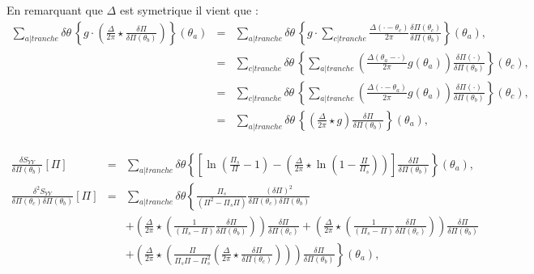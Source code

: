 		En remarquant que $\Delta$ est symetrique il vient que : 
	\begin{eqnarray}
		\sum_{a\vert tranche}   \delta \theta \,  \left \{ g  \cdot  	\left  ( \frac{\Delta}{2\pi} \star  \frac{\delta \Pi}{\delta \Pi(\theta_b)} \right ) \right \}( \theta_a) & = & \sum_{a\vert tranche}   \delta \theta \,  \left \{ g  \cdot  \sum_{c\vert tranche}    	
		 \frac{\Delta ( \cdot - \theta_c)}{2\pi}  \frac{\delta \Pi (\theta_c) }{\delta \Pi(\theta_b)}\right \}( \theta_a),\\
		 & = & \sum_{c\vert tranche}   \delta \theta \,  \left \{  \sum_{a\vert tranche}      	
		  \left ( \frac{\Delta ( \theta_a - \cdot )}{2\pi}  g ( \theta_a) \right ) \frac{\delta \Pi (\cdot) }{\delta \Pi(\theta_b)}\right \}( \theta_c),\\
		  & = & \sum_{c\vert tranche}   \delta \theta \,  \left \{  \sum_{a\vert tranche}      	
		  \left ( \frac{\Delta ( \cdot - \theta_a)}{2\pi}  g ( \theta_a) \right ) \frac{\delta \Pi (\cdot) }{\delta \Pi(\theta_b)}\right \}( \theta_c),\\
		  & = & \sum_{a\vert tranche}   \delta \theta \,  \left \{        	
		  \left ( \frac{\Delta}{2\pi}   \star g \right ) \frac{\delta \Pi  }{\delta \Pi(\theta_b)}\right \}( \theta_a),\\
	\end{eqnarray}	
	
	\begin{eqnarray}
			\frac{ \delta S_{YY} }{ \delta \Pi(\theta_b)} [\Pi ]  & = & \sum_{a\vert tranche}   \delta \theta \left \{ \left [ \ln \left ( \frac{ \Pi_s }{ \Pi} - 1 \right ) -  \left ( \frac{ \Delta}{2 \pi} \star \ln \left ( 1 - \frac{ \Pi}{ \Pi_s}\right )  \right) \right ]\frac{\delta \Pi }{ \delta \Pi (\theta_b) } \right \} ( \theta_	a ),\\
			\frac{ \delta^2 S_{YY} }{ \delta \Pi(\theta_c) \delta \Pi(\theta_b)  } [\Pi ]  & = & \sum_{a \vert tranche}   \delta \theta \left \{  \frac{\Pi_s}{(\Pi^2  - \Pi_s\Pi)} \frac{(\delta \Pi)^2}{ \delta \Pi(\theta_c) \delta \Pi(\theta_b)  } \right . \\
		&  &  +  \left . \left (  \frac{\Delta}{2\pi} \star \left ( \frac{1 }{(\Pi_s -\Pi) }  \frac{\delta \Pi}{\delta \Pi(\theta_b)}  \right )   \right ) \frac{\delta \Pi}{\delta \Pi(\theta_c)}+  \left (  \frac{\Delta}{2\pi} \star \left ( \frac{1}{( \Pi_s -  \Pi) } \frac{\delta \Pi}{\delta \Pi(\theta_c)} \right) \right )\frac{\delta \Pi}{\delta \Pi(\theta_b)}  \right . \\
		& & + \left .  \left (  \frac{\Delta}{2\pi} \star \left ( \frac{\Pi }{\Pi_s\Pi - \Pi_s^2 }\left (  \frac{\Delta}{2\pi} \star\frac{\delta \Pi}{\delta \Pi(\theta_c)} \right )\right ) \right ) \frac{\delta \Pi}{\delta \Pi(\theta_b)}  \right \}(\theta_a),	
	\end{eqnarray}
	
